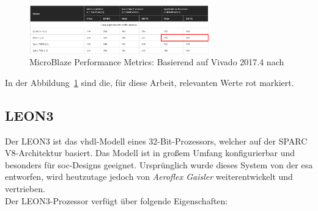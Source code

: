 \begin{figure}[H]
\centering
\includegraphics[width=0.7\textwidth]{Hauptteil/microblazeleistung.png}
\caption{MicroBlaze Performance Metrics: Basierend auf Vivado 2017.4 nach~\cite{microblaze}}
\label{fig:microblazeleistung}
\end{figure}

In der Abbildung~\ref{fig:microblazeleistung} sind die, für diese Arbeit, relevanten Werte rot markiert.\\

\subsection{LEON3}\label{kap:leon3}


Der LEON3 ist das \ac{vhdl}-Modell eines 32-Bit-Prozessors, welcher auf der SPARC V8-Architektur basiert. Das Modell ist in großem Umfang konfigurierbar und besonders für \ac{soc}-Designs geeignet.
Ursprünglich wurde dieses System von der \ac{esa} entworfen, wird heutzutage jedoch von \emph{Aeroflex Gaisler} weiterentwickelt und vertrieben.\\
Der LEON3-Prozessor verfügt über folgende Eigenschaften:\cite{leon}\\


